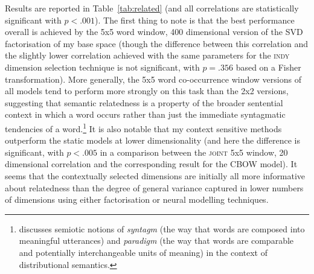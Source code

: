 Results are reported in Table~\ref{tab:related} (and all correlations are statistically significant with $p < .001$).  The first thing to note is that the best performance overall is achieved by the 5x5 word window, 400 dimensional version of the SVD factorisation of my base space (though the difference between this correlation and the slightly lower correlation achieved with the same parameters for the \textsc{indy} dimension selection technique is not significant, with $p = .356$ based on a Fisher transformation).  More generally, the 5x5 word co-occurrence window versions of all models tend to perform more strongly on this task than the 2x2 versions, suggesting that semantic relatedness is a property of the broader sentential context in which a word occurs rather than just the immediate syntagmatic tendencies of a word.\footnote{\cite{Sahlgren} discusses  semiotic notions of \emph{syntagm} (the way that words are composed into meaningful utterances) and \emph{paradigm} (the way that words are comparable and potentially interchangeable units of meaning) in the context of distributional semantics.}  It is also notable that my context sensitive methods outperform the static models at lower dimensionality (and here the difference is significant, with $p < .005$ in a comparison between the \textsc{joint} 5x5 window, 20 dimensional correlation and the corresponding result for the \textsc{CBOW} model).  It seems that the contextually selected dimensions are initially all more informative about relatedness than the degree of general variance captured in lower numbers of dimensions using either factorisation or neural modelling techniques.

